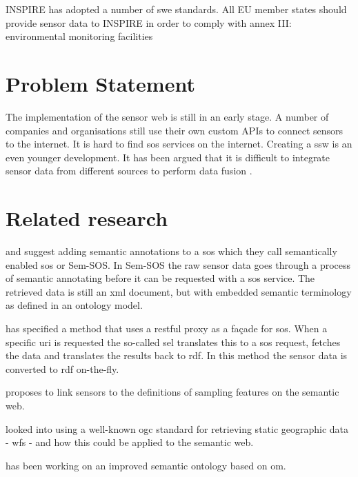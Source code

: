 INSPIRE has adopted a number of \ac{swe} standards. All EU member states should provide sensor data to INSPIRE in order to comply with annex III: environmental monitoring facilities \\

\section{Problem Statement}
The implementation of the sensor web is still in an early stage. 
A number of companies and organisations still use their own custom APIs to connect sensors to the internet. 
It is hard to find \ac{sos} services on the internet. Creating a \ac{ssw} is an even younger development. 
It has been argued that it is difficult to integrate sensor data from different sources to perform data fusion \citep{SSW:Corcho}. 


\section{Related research}
\cite{SSW:Henson} and \cite{SSW:Pschorr} suggest adding semantic annotations to a \ac{sos} which they call semantically enabled \ac{sos} or Sem-SOS. In Sem-SOS the raw sensor data goes through a process of semantic annotating before it can be requested with a \ac{sos} service. The retrieved data is still an \ac{xml} document, but with embedded semantic terminology as defined in an ontology model. 

\cite{SSW:Janowicz} has specified a method that uses a \ac{rest}ful proxy as a fa\c{c}ade for \ac{sos}. When a specific \ac{uri} is requested the so-called \ac{sel} translates this to a \ac{sos} request, fetches the data and translates the results back to \ac{rdf}. In this method the sensor data is converted to \ac{rdf} on-the-fly.  

\cite{SSW:Stasch} proposes to link sensors to the definitions of sampling features on the semantic web.

\cite{SW:Jones} looked into using a well-known \ac{ogc} standard for retrieving static geographic data - \ac{wfs} - and how this could be applied to the semantic web.

\cite{SSW:Cox3} has been working on an improved semantic ontology based on \ac{om}. 

